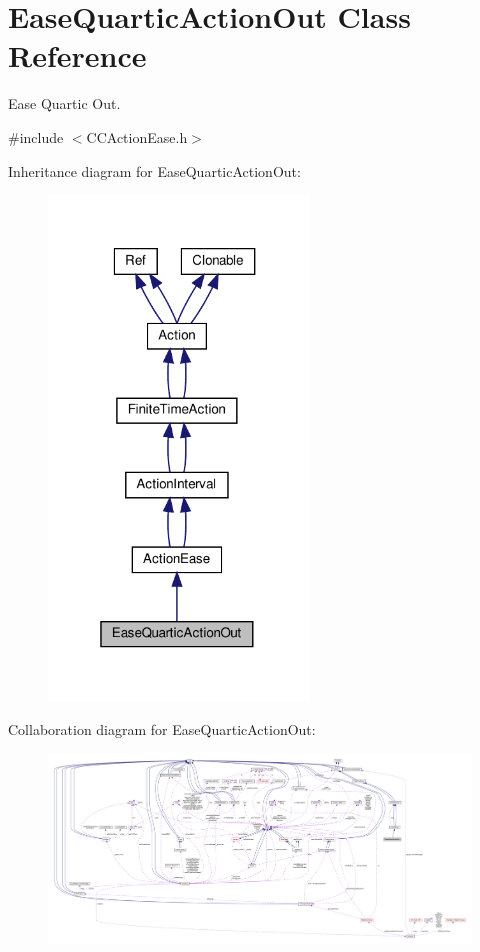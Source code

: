 \hypertarget{classEaseQuarticActionOut}{}\section{Ease\+Quartic\+Action\+Out Class Reference}
\label{classEaseQuarticActionOut}


Ease Quartic Out.  




{\ttfamily \#include $<$C\+C\+Action\+Ease.\+h$>$}



Inheritance diagram for Ease\+Quartic\+Action\+Out\+:
\nopagebreak
\begin{figure}[H]
\begin{center}
\leavevmode
\includegraphics[width=196pt]{classEaseQuarticActionOut__inherit__graph}
\end{center}
\end{figure}


Collaboration diagram for Ease\+Quartic\+Action\+Out\+:
\nopagebreak
\begin{figure}[H]
\begin{center}
\leavevmode
\includegraphics[width=350pt]{classEaseQuarticActionOut__coll__graph}
\end{center}
\end{figure}

